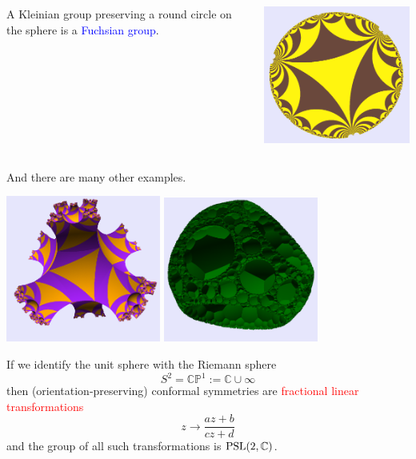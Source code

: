 \documentclass{beamer}
\def\CP{\mathbb{CP}}
\def\C{\mathbb{C}}
\def\PSL{\textnormal{PSL}}
\begin{document}
\frame
{
\begin{columns}[c]
\column{1.1in}
A Kleinian group 
preserving a round circle
on the sphere is a
\textcolor{blue}{Fuchsian group}.
\column{3in}
\begin{center}
\includegraphics[width=3in]{fuchsian.png}
\end{center}
\end{columns}
}
\frame
{
And there are many other examples.
\begin{center}
\includegraphics[width=2in]{Schottky.png}\hskip 2pt
\includegraphics[width=2in]{7gon_spine.png}
\end{center}
}
\frame
{
If we identify the unit sphere with the \textcolor{dgreen}{Riemann sphere} 
$$S^2 = \CP^1:=\C\cup \infty$$
then (orientation-preserving) conformal symmetries are \textcolor{red}{fractional linear
transformations}
$$z \to \frac {az+b} {cz+d}$$
and the group of all such transformations is $\PSL(2,\C)$.
}
\end{document}

